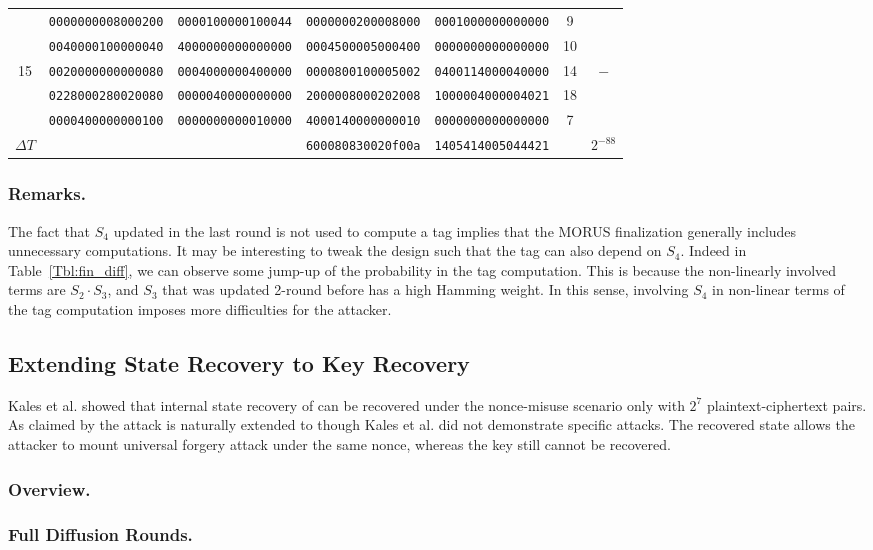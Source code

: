 \begin{table}[!tb]
\begin{center}
{\begin{tabular}{ccccccc}
      & {\tt 0000000008000200} & {\tt 0000100000100044} & {\tt 0000000200008000} & {\tt 0001000000000000} & 9  & \\
      & {\tt 0040000100000040} & {\tt 4000000000000000} & {\tt 0004500005000400} & {\tt 0000000000000000} & 10 & \\
15    & {\tt 0020000000000080} & {\tt 0004000000400000} & {\tt 0000800100005002} & {\tt 0400114000040000} & 14 & $-$\\
      & {\tt 0228000280020080} & {\tt 0000040000000000} & {\tt 2000008000202008} & {\tt 1000004000004021} & 18 & \\
      & {\tt 0000400000000100} & {\tt 0000000000010000} & {\tt 4000140000000010} & {\tt 0000000000000000} & 7  & \\ \hline

$\Delta T$ &                   &                        & {\tt 600080830020f00a} & {\tt 1405414005044421} & & $2^{-88}$ \\ \hline
\end{tabular}
}
\end{center}
\end{table}

\subsubsection{Remarks.} The fact that $S_4$ updated in the last round is not used to compute a tag implies that the MORUS finalization generally includes unnecessary computations. It may be interesting to tweak the design such that the tag can also depend on $S_4$. Indeed in Table~\ref{Tbl:fin_diff}, we can observe some jump-up of the probability in the tag computation. This is because the non-linearly involved terms are $S_2 \cdot S_3$, and $S_3$ that was updated 2-round before has a high Hamming weight. In this sense, involving $S_4$ in non-linear terms of the tag computation imposes more difficulties for the attacker.

\subsection{Extending State Recovery to Key Recovery}
Kales et al. \cite{cryptoeprint:2017:1137} showed that internal state recovery of  can be recovered under the nonce-misuse scenario only with $2^7$ plaintext-ciphertext pairs. As claimed by \cite{cryptoeprint:2017:1137} the attack is naturally extended to  though Kales et al. \cite{cryptoeprint:2017:1137} did not demonstrate specific attacks. The recovered state allows the attacker to mount universal forgery attack under the same nonce, whereas the key still cannot be recovered.

\subsubsection{Overview.}
\subsubsection{Full Diffusion Rounds.}